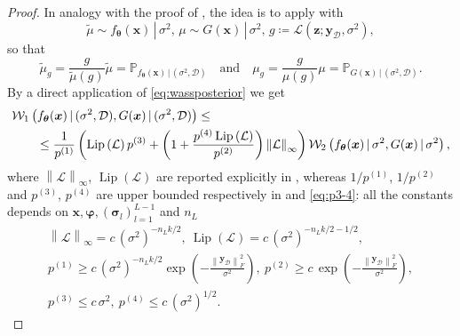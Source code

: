 \documentclass[a4paper, 11pt, reqno]{amsart}
\theoremstyle{plain}
\theoremstyle{remark}
\theoremstyle{definition}
\newcommand{\given}{\, | \,}
\newcommand{\wass}[3][2]{\mathcal{W}_{#1}\left(#2, #3\right)}
\newcommand{\norm}[1]{\left\lVert#1\right\rVert}
\newcommand{\lipschitz}[1]{\operatorname{Lip}\left(#1\right)}
\renewcommand{\exp}[1]{\operatorname{exp}\left(#1\right)}
\newcommand{\train}{\mathcal{D}}
\begin{document}
\begin{proof}
	In analogy with the proof of , the idea is to apply  with
	\begin{equation*}
		\widetilde{\mu} \sim f_{\bm{\theta}}(\bm{x}) \given \sigma^2, \, \mu \sim G(\bm{x}) \given \sigma^2, \, g \coloneqq \mathcal{L}(\bm{z}; \bm{y}_{\mathcal{D}}, \sigma^2),
	\end{equation*}
	so that
	\begin{equation*}
		\widetilde{\mu}_g = \frac{g}{\widetilde{\mu}(g)} \widetilde{\mu} = \mathbb{P}_{f_{\bm{\theta}}(\bm{x}) \given (\sigma^2, \train)} \quad \text{and} \quad \mu_g = \frac{g}{\mu(g)} \mu = \mathbb{P}_{G(\bm{x}) \given (\sigma^2, \train)}.
	\end{equation*}
	By a direct application of \cref{eq:wassposterior} we get
	\begin{equation} \label{eq:nngpsigma1}
		\begin{aligned}
			& \wass[1]{f_{\bm{\theta}}(\bm{x}) \given (\sigma^2, \train)}{G(\bm{x}) \given (\sigma^2, \train)} \leq \\
			& \kern20pt \leq \frac{1}{p^{(1)}} \left(\lipschitz{\mathcal{L}} p^{(3)} + \left(1 + \frac{p^{(4)} \lipschitz{\mathcal{L}}}{p^{(2)}}\right) \norm{\mathcal{L}}_{\infty}\right) \wass[2]{f_{\bm{\theta}}(\bm{x}) \given \sigma^2}{G(\bm{x}) \given \sigma^2},
		\end{aligned}
	\end{equation}
	where $\norm{\mathcal{L}}_{\infty}$, $\lipschitz{\mathcal{L}}$ are reported explicitly in , whereas $1 / p^{(1)}$, $1 / p^{(2)}$ and $p^{(3)}$, $p^{(4)}$ are upper bounded respectively in  and \cref{eq:p3-4}: all the constants depends on $\bm{x}, \bm{\varphi}, (\bm{\sigma}_l)_{l = 1}^{L - 1}$ and $n_L$
	\begin{equation} \label{eq:p1-4final}
		\begin{gathered}
			\norm{\mathcal{L}}_{\infty} = c \, \left(\sigma^2\right)^{- n_L k / 2}, \ \lipschitz{\mathcal{L}} = c \, \left(\sigma^2\right)^{-n_L k / 2 - 1/2}, \\
			p^{(1)} \geq c \, \left(\sigma^2\right)^{- n_L k / 2} \exp{-\frac{\norm{\bm{y}_{\mathcal{D}}}_F^2}{\sigma^2}}, \ p^{(2)} \geq c \, \exp{-\frac{\norm{\bm{y}_{\mathcal{D}}}_F^2}{\sigma^2}}, \\
			p^{(3)} \leq c \, \sigma^2, \ p^{(4)} \leq c \, \left(\sigma^2\right)^{1/2}.
		\end{gathered}
	\end{equation}

\end{proof}
\end{document}
